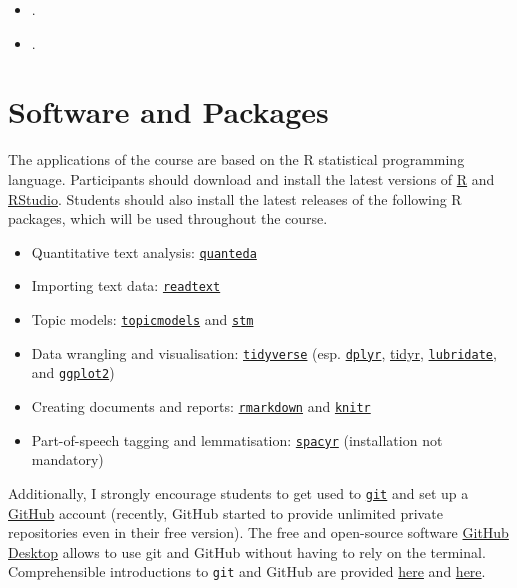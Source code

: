 \documentclass[abstract=on,parskip=full,headings=standardclasses,fontsize=11pt,paper=a4]{scrartcl}
\begin{document}
\begin{itemize}
\item {}.
\item {}.
\end{itemize}

\section*{Software and Packages}

The applications of the course are based on the \textsf{R} statistical programming language. Participants should download and install the latest versions of \textsf{\href{https://www.r-project.org}{R}} and \href{https://www.rstudio.com/products/rstudio/}{RStudio}. Students should also install the latest releases of the following  \textsf{R} packages, which will be used throughout the course.

\begin{itemize}
\item Quantitative text analysis: \href{https://quanteda.io/}{\texttt{quanteda}}
\item Importing text data: \href{https://readtext.quanteda.io/}{\texttt{readtext}}
\item Topic models: \href{https://cran.r-project.org/web/packages/topicmodels/index.html}{\texttt{topicmodels}}  and \href{https://www.structuraltopicmodel.com/}{\texttt{stm}}
\item Data wrangling and visualisation: \href{https://www.tidyverse.org}{\texttt{tidyverse}} (esp. \href{https://dplyr.tidyverse.org}{\texttt{dplyr}}, \href{https://tidyr.tidyverse.org}{tidyr}, \href{https://lubridate.tidyverse.org}{\texttt{lubridate}}, and \href{https://ggplot2.tidyverse.org}{\texttt{ggplot2}})
\item Creating documents and reports: \href{https://rmarkdown.rstudio.com}{\texttt{rmarkdown}} and \href{https://yihui.name/knitr/}{\texttt{knitr}}
\item Part-of-speech tagging and lemmatisation: \href{https://spacyr.quanteda.io}{\texttt{spacyr}} (installation not mandatory)
\end{itemize}

Additionally, I strongly encourage students to get used to \href{https://git-scm.com}{\texttt{git}}  and set up a \href{https://github.com}{GitHub} account (recently, GitHub started to provide unlimited private repositories even in their free version). The free  and open-source software \href{https://desktop.github.com}{GitHub Desktop} allows to use git and GitHub without having to rely on the terminal. Comprehensible introductions to \texttt{git} and GitHub are provided \href{https://guides.github.com/activities/hello-world/}{here} and \href{https://happygitwithr.com}{here}.
\end{document}
